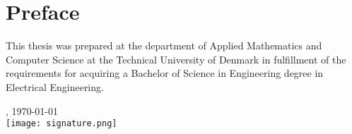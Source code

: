 \chapter{Preface}
This thesis was prepared at the department of Applied Mathematics and Computer Science at the Technical University of Denmark in fulfillment of the requirements for acquiring a Bachelor of Science in Engineering degree in Electrical Engineering.

\vfill

{
\centering
    \thesislocation{}, \today\\[1cm]
    \hspace{3cm}\texttt{[image: signature.png]}\\[1cm]
\begin{flushright}
    \thesisauthor{}
\end{flushright}
}